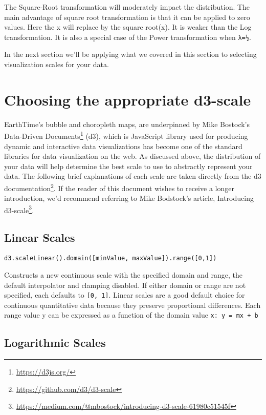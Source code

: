\documentclass[
]{krantz}
\renewcommand{\href}[2]{#2\footnote{\url{#1}}}
\begin{document}
The Square-Root transformation will moderately impact the distribution. The main advantage of square root transformation is that it can be applied to zero values. Here the x will replace by the square root(x). It is weaker than the Log transformation. It is also a special case of the Power transformation when \texttt{λ=½}.

In the next section we'll be applying what we covered in this section to selecting visualization scales for your data.

\hypertarget{choosing-the-appropriate-d3-scale}{%
\section{Choosing the appropriate d3-scale}\label{choosing-the-appropriate-d3-scale}}

EarthTime's bubble and choropleth maps, are underpinned by Mike Bostock's \href{https://d3js.org/}{Data-Driven Documents} (d3), which is JavaScript library used for producing dynamic and interactive data visualizations has become one of the standard libraries for data visualization on the web. As discussed above, the distribution of your data will help determine the best scale to use to abstractly represent your data. The following brief explanations of each scale are taken directly from the \href{https://github.com/d3/d3-scale}{d3 documentation}. If the reader of this document wishes to receive a longer introduction, we'd recommend referring to Mike Bodstock's article, \href{https://medium.com/@mbostock/introducing-d3-scale-61980c51545f}{Introducing d3-scale}.

\hypertarget{linear-scales}{%
\subsection*{Linear Scales}\label{linear-scales}}


\texttt{d3.scaleLinear().domain({[}minValue,\ maxValue{]}).range({[}0,1{]})}

Constructs a new continuous scale with the specified domain and range, the default interpolator and clamping disabled. If either domain or range are not specified, each defaults to \texttt{{[}0,\ 1{]}}. Linear scales are a good default choice for continuous quantitative data because they preserve proportional differences. Each range value y can be expressed as a function of the domain value \texttt{x:\ y\ =\ mx\ +\ b}

\hypertarget{logarithmic-scales}{%
\subsection*{Logarithmic Scales}\label{logarithmic-scales}}
\end{document}
